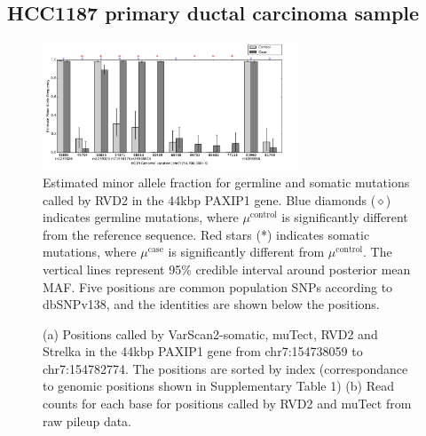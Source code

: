 \documentclass{bioinfo}
\begin{document}
\subsection{HCC1187 primary ductal carcinoma sample}\label{sec:brca}
\begin{figure}[!hbpt]
\centering
\vspace{-10pt}
\includegraphics[width=0.68\textwidth]{pdf_figs/HCC1187_MuBarPlot.pdf}
\caption{Estimated minor allele fraction for germline and somatic mutations called by RVD2 in the 44kbp PAXIP1 gene. Blue diamonds ($\diamond$) indicates germline mutations, where $\mu^{\text{control}}$ is significantly different from the reference sequence. Red stars (*) indicates somatic mutations, where $\mu^{\text{case}}$ is significantly different from $ \mu^{\text{control}}$. The  vertical lines represent 95\% credible interval around posterior mean MAF. Five positions are common population SNPs according to dbSNPv138, and the identities are shown below the positions.}
\vspace{-10pt}
\label{fig:brca_MAF}
\end{figure}

\begin{figure}[!pthb]
\vspace{-10pt}
    \centering
    \caption{(a) Positions called by VarScan2-somatic, muTect, RVD2 and Strelka in the 44kbp PAXIP1 gene from chr7:154738059 to chr7:154782774. The positions are sorted by index (correspondance to genomic positions shown in Supplementary Table 1) (b) Read counts for each base for positions called by RVD2 and muTect from raw pileup data.}%
    \label{fig:brca_dot}%
\vspace{-10pt}
\end{figure}
\end{document}
